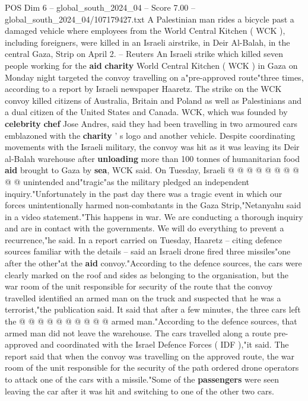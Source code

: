 \begin{textsample}{POS Dim 6 – global\_south\_2024\_04 – Score 7.00 – global\_south\_2024\_04/107179427.txt}  \label{ex:f6_pos_087}
A Palestinian man rides a bicycle past a damaged vehicle where employees from the World Central Kitchen ( WCK ), including foreigners, were killed in an Israeli airstrike, in Deir Al-Balah, in the central Gaza, Strip on April 2. -- Reuters An Israeli strike which killed seven people working for the \textbf{aid} \textbf{charity} World Central Kitchen ( WCK ) in Gaza on Monday night targeted the convoy travelling on a"pre-approved route"three times, according to a report by Israeli newspaper Haaretz.
The strike on the WCK convoy killed citizens of Australia, Britain and Poland as well as Palestinians and a dual citizen of the United States and Canada.
WCK, which was founded by \textbf{celebrity} \textbf{chef} Jose Andres, said they had been travelling in two armoured cars emblazoned with the \textbf{charity} ' s logo and another vehicle.
Despite coordinating movements with the Israeli military, the convoy was hit as it was leaving its Deir al-Balah warehouse after \textbf{unloading} more than 100 tonnes of humanitarian food \textbf{aid} brought to Gaza by \textbf{sea}, WCK said.
On Tuesday, Israeli @ @ @ @ @ @ @ @ @ @ unintended and"tragic"as the military pledged an independent inquiry."Unfortunately in the past day there was a tragic event in which our forces unintentionally harmed non-combatants in the Gaza Strip,"Netanyahu said in a video statement."This happens in war.
We are conducting a thorough inquiry and are in contact with the governments.
We will do everything to prevent a recurrence,"he said.
In a report carried on Tuesday, Haaretz -- citing defence sources familiar with the details -- said an Israeli drone fired three missiles"one after the other"at the \textbf{aid} convoy."According to the defence sources, the cars were clearly marked on the roof and sides as belonging to the organisation, but the war room of the unit responsible for security of the route that the convoy travelled identified an armed man on the truck and suspected that he was a terrorist,"the publication said.
It said that after a few minutes, the three cars left the @ @ @ @ @ @ @ @ @ @ armed man."According to the defence sources, that armed man did not leave the warehouse.
The cars travelled along a route pre-approved and coordinated with the Israel Defence Forces ( IDF ),"it said.
The report said that when the convoy was travelling on the approved route, the war room of the unit responsible for the security of the path ordered drone operators to attack one of the cars with a missile."Some of the \textbf{passengers} were seen leaving the car after it was hit and switching to one of the other two cars.

\end{textsample}

